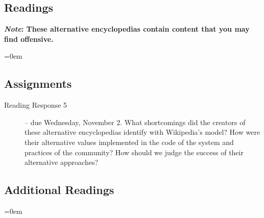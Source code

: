 \documentclass[10pt]{memoir}
\newenvironment{readinglist}{
\begin{list}{}{\leftmargin=8pt \itemindent=0em}
  \setlength{\itemsep}{8pt}
  \setlength{\parskip}{0em}
  \setlength{\parsep}{1em}
  \setlength{\parindent}{8em}}
{\end{list}}
\begin{document}
    \subsection{Readings}
    \textbf{\textit{Note}: These alternative encyclopedias contain content that you may find offensive.}\vspace{-10pt}
    \begin{readinglist}
        \item {}
        \item {}
        \item {}
        \item {}
        \item {}
        \item {}
    \end{readinglist}
    
    \subsection{Assignments}
    \begin{description}%
        \item[Reading Response 5 ] -- due Wednesday, November 2. What shortcomings did the creators of these alternative encyclopedias identify with Wikipedia's model? How were their alternative values implemented in the code of the system and practices of the community? How should we judge the success of their alternative approaches?
    \end{description}
    
    \subsection{Additional Readings}
    \begin{readinglist}
        \item {}
        \item {}
        \item {}
        \item {}
        \item {}
        \item {}
    \end{readinglist}
    
\end{document}
